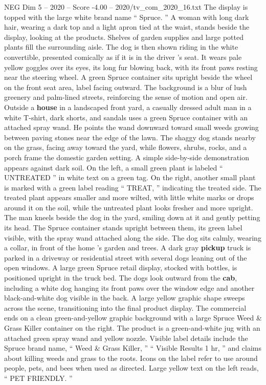 \begin{textsample}{NEG Dim 5 – 2020 – Score -4.00 – 2020/tv\_com\_2020\_16.txt}
The display is topped with the large white brand name “ Spruce. ” A woman with long dark hair, wearing a dark top and a light apron tied at the waist, stands beside the display, looking at the products.
Shelves of garden supplies and large potted plants fill the surrounding aisle.
The dog is then shown riding in the white convertible, presented comically as if it is in the driver ’s seat.
It wears pale yellow goggles over its eyes, its long fur blowing back, with its front paws resting near the steering wheel.
A green Spruce container sits upright beside the wheel on the front seat area, label facing outward.
The background is a blur of lush greenery and palm-lined streets, reinforcing the sense of motion and open air.
Outside a \textbf{house} in a landscaped front yard, a casually dressed adult man in a white T-shirt, dark shorts, and sandals uses a green Spruce container with an attached spray wand.
He points the wand downward toward small weeds growing between paving stones near the edge of the lawn.
The shaggy dog stands nearby on the grass, facing away toward the yard, while flowers, shrubs, rocks, and a porch frame the domestic garden setting.
A simple side-by-side demonstration appears against dark soil.
On the left, a small green plant is labeled “ UNTREATED ” in white text on a green tag.
On the right, another small plant is marked with a green label reading “ TREAT, ” indicating the treated side.
The treated plant appears smaller and more wilted, with little white marks or drops around it on the soil, while the untreated plant looks fresher and more upright.
The man kneels beside the dog in the yard, smiling down at it and gently petting its head.
The Spruce container stands upright between them, its green label visible, with the spray wand attached along the side.
The dog sits calmly, wearing a collar, in front of the home ’s garden and trees.
A dark gray \textbf{pickup} truck is parked in a driveway or residential street with several dogs leaning out of the open windows.
A large green Spruce retail display, stocked with bottles, is positioned upright in the truck bed.
The dogs look outward from the \textbf{cab}, including a white dog hanging its front paws over the window edge and another black-and-white dog visible in the back.
A large yellow graphic shape sweeps across the scene, transitioning into the final product display.
The commercial ends on a clean green-and-yellow graphic background with a large Spruce Weed \& Grass Killer container on the right.
The product is a green-and-white jug with an attached green spray wand and yellow nozzle.
Visible label details include the Spruce brand name, “ Weed \& Grass Killer, ” “ Visible Results 1 hr, ” and claims about killing weeds and grass to the roots.
Icons on the label refer to use around people, pets, and bees when used as directed.
Large yellow text on the left reads, “ PET FRIENDLY. ”

\end{textsample}
